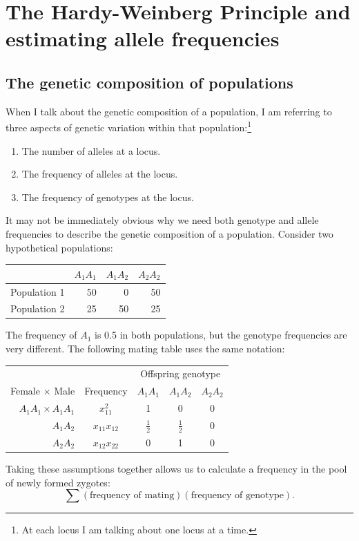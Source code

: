 \documentclass{book}
\newcommand{\half}{\frac{1}{2}}
\begin{document}
\chapter{The Hardy-Weinberg Principle and estimating allele frequencies}
\section*{The genetic composition of populations}

When I talk about the genetic composition of a population, I am referring to
three aspects of genetic variation within that population:\footnote{At each
locus I am talking about one locus at a time.}
\begin{enumerate}
\item The number of alleles at a locus.
\item The frequency of alleles at the locus.
\item The frequency of genotypes at the locus.
\end{enumerate}

It may not be immediately obvious why we need both genotype and allele
frequencies to describe the genetic composition of a population. Consider two
hypothetical populations:
\begin{center}
\begin{tabular}{lrrr}
             & $A_1A_1$ & $A_1A_2$ & $A_2A_2$ \\
\hline\hline
Population 1 &       50 &        0 &       50 \\
Population 2 &       25 &       50 &       25 \\
\hline
\end{tabular}
\end{center}

The frequency of $A_1$ is 0.5 in both populations, but the genotype
frequencies are very different. The following mating table uses the same
notation:
\begin{center}
\begin{tabular}{rcccc}
\hline\hline
                       &           & \multicolumn{3}{c}{Offspring genotype} \\
Female $\times$ Male   & Frequency & $A_1A_1$ & $A_1A_2$ & $A_2A_2$ \\
\hline
$A_1A_1 \times A_1A_1$ & $x_{11}^2$ & 1 & 0 & 0 \\
              $A_1A_2$ & $x_{11}x_{12}$ & $\half$ & $\half$ & 0 \\
              $A_2A_2$ & $x_{12}x_{22}$ & 0 & 1 & 0 \\
\hline
\end{tabular}
\end{center}

Taking these assumptions together allows us to calculate a frequency in the
pool of newly formed zygotes:
\[
\sum(\text{frequency of mating})(\text{frequency of genotype}) .
\]
\end{document}
